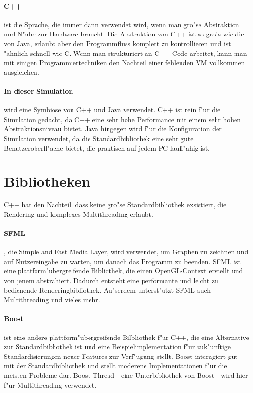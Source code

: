 \documentclass[14pt, a4paper]{report}
\begin{document}
\paragraph{C++} ist die Sprache, die immer dann verwendet wird, wenn man gro"se 
Abstraktion und N"ahe zur Hardware braucht. Die Abstraktion von C++ ist so gro"s wie die
von Java, erlaubt aber den Programmfluss komplett zu kontrollieren
und ist "ahnlich schnell
wie C. Wenn man strukturiert an C++-Code arbeitet, kann man mit einigen 
Programmiertechniken  
den Nachteil einer fehlenden VM vollkommen ausgleichen.

\paragraph{In dieser Simulation} wird eine Symbiose von C++ und Java verwendet. C++ ist rein f"ur 
die Simulation gedacht, da C++ eine sehr hohe Performance mit einem sehr hohen 
Abstraktionsniveau bietet. Java hingegen wird f"ur die Konfiguration der 
Simulation verwendet, da die
Standardbibliothek eine sehr gute Benutzeroberfl"ache bietet, die praktisch auf jedem
PC lauff"ahig ist.

\section{Bibliotheken}
C++ hat den Nachteil, dass keine gro"se Standardbibliothek exsistiert, 
die Rendering und komplexes Multithreading erlaubt.

\paragraph{SFML}, die Simple and Fast Media Layer, wird verwendet, um Graphen zu 
zeichnen und auf Nutzereingabe zu warten, um danach das Programm zu beenden. SFML
ist eine plattform"ubergreifende Bibliothek, die einen OpenGL-Context erstellt und von
jenem abstrahiert. Dadurch entsteht eine performante und leicht zu bedienende 
Renderingbibliothek. Au"serdem unterst"utzt SFML auch Multithreading und vieles mehr.

\paragraph{Boost} ist eine andere plattform"ubergreifende Bilbliothek f"ur C++, die eine
Alternative zur Standardbibliothek ist und eine Beispielimplementation f"ur zuk"unftige 
Standardisierungen neuer Features zur Verf"ugung stellt. Boost interagiert gut mit der 
Standardbibliothek und stellt moderene Implementationen f"ur
die meisten Probleme dar. Boost-Thread - eine Unterbibliothek von Boost -
wird hier f"ur Multithreading verwendet.
\end{document}
